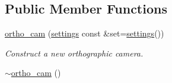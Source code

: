 \subsection*{Public Member Functions}
\begin{DoxyCompactItemize}
\item 
\hyperlink{classgfx_1_1ortho__cam_a02874bea9d05ea281cf2cb55142a62a9}{ortho\-\_\-cam} (\hyperlink{classgfx_1_1ortho__cam_1_1settings}{settings} const \&set=\hyperlink{classgfx_1_1ortho__cam_1_1settings}{settings}())
\begin{DoxyCompactList}\small\item\em Construct a new orthographic camera. \end{DoxyCompactList}\item 
\hypertarget{classgfx_1_1ortho__cam_a8f711f78d347d0a99a1f8b2333701656}{\hyperlink{classgfx_1_1ortho__cam_a8f711f78d347d0a99a1f8b2333701656}{$\sim$ortho\-\_\-cam} ()}\label{classgfx_1_1ortho__cam_a8f711f78d347d0a99a1f8b2333701656}


\end{DoxyCompactItemize}
